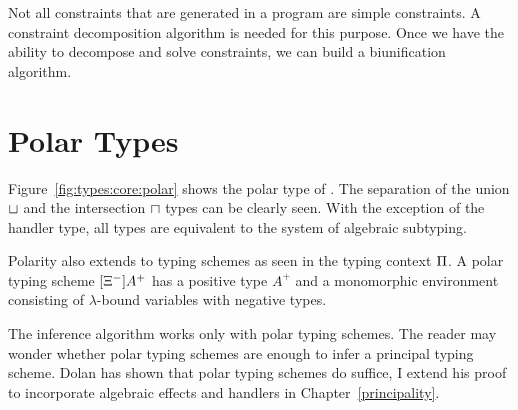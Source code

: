 Not all constraints that are generated in a program are simple constraints. A constraint decomposition algorithm is needed for this purpose. Once we have the ability to decompose and solve constraints, we can build a biunification algorithm.

\section{Polar Types}\label{polarity}

Figure~\ref{fig:types:core:polar} shows the polar type of \core. The separation of the union $\sqcup$ and the intersection $\sqcap$ types can be clearly seen. With the exception of the handler type, all types are equivalent to the system of algebraic subtyping. 

Polarity also extends to typing schemes as seen in the typing context $\Pi$. A polar typing scheme $[\Xi^-]A^+$ has a positive type $A^+$ and a monomorphic environment consisting of $\lambda$-bound variables with negative types. 

The inference algorithm works only with polar typing schemes. The reader may wonder whether polar typing schemes are enough to infer a principal typing scheme. Dolan has shown that polar typing schemes do suffice, I extend his proof to incorporate algebraic effects and handlers in Chapter~\ref{principality}. \cite{dolan2017algebraic}

